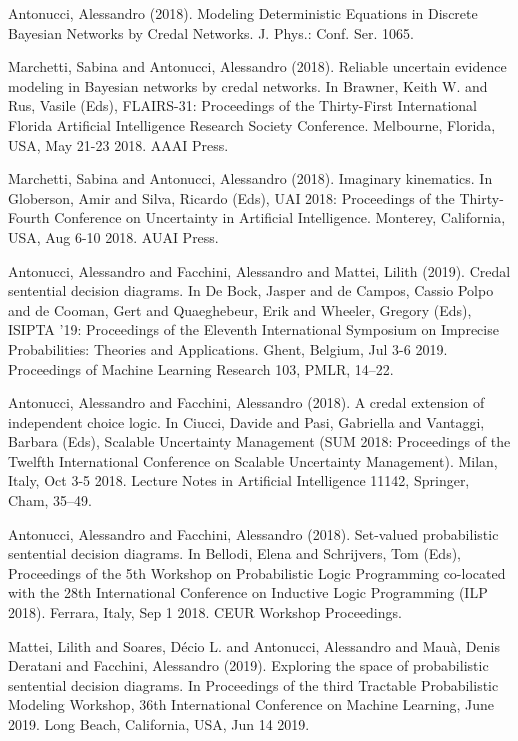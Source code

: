 \begin{cventries}
\begin{cvitems}
\item Antonucci, Alessandro (2018).   Modeling Deterministic Equations in Discrete Bayesian Networks by Credal Networks.   J. Phys.: Conf. Ser. 1065.
\item Marchetti, Sabina and Antonucci, Alessandro (2018).   Reliable uncertain evidence modeling in Bayesian networks by credal networks.   In Brawner, Keith W. and Rus, Vasile (Eds), FLAIRS-31: Proceedings of the Thirty-First International Florida Artificial Intelligence Research Society Conference.   Melbourne, Florida, USA,   May 21-23 2018.   AAAI Press.
\item Marchetti, Sabina and Antonucci, Alessandro (2018).   Imaginary kinematics.   In Globerson, Amir and Silva, Ricardo (Eds), UAI 2018: Proceedings of the Thirty-Fourth Conference on Uncertainty in Artificial Intelligence.   Monterey, California, USA,   Aug 6-10 2018.   AUAI Press.
\item Antonucci, Alessandro and Facchini, Alessandro and Mattei, Lilith (2019).   Credal sentential decision diagrams.   In De Bock, Jasper and de Campos, Cassio Polpo and de Cooman, Gert and Quaeghebeur, Erik and Wheeler, Gregory (Eds), ISIPTA ’19: Proceedings of the Eleventh International Symposium on Imprecise Probabilities: Theories and Applications.   Ghent, Belgium, Jul 3-6 2019.   Proceedings of Machine Learning Research 103, PMLR, 14–22.
\item Antonucci, Alessandro and Facchini, Alessandro (2018).   A credal extension of independent choice logic.   In Ciucci, Davide and Pasi, Gabriella and Vantaggi, Barbara (Eds), Scalable Uncertainty Management (SUM 2018: Proceedings of the Twelfth International Conference on Scalable Uncertainty Management).   Milan, Italy, Oct 3-5 2018.   Lecture Notes in Artificial Intelligence 11142, Springer, Cham, 35–49.
\item Antonucci, Alessandro and Facchini, Alessandro (2018).   Set-valued probabilistic sentential decision diagrams.   In Bellodi, Elena and Schrijvers, Tom (Eds), Proceedings of the 5th Workshop on Probabilistic Logic Programming co-located with the 28th International Conference on Inductive Logic Programming (ILP 2018).   Ferrara, Italy,   Sep 1 2018.   CEUR Workshop Proceedings.
\item Mattei, Lilith and Soares, Décio L. and Antonucci, Alessandro and Mauà, Denis Deratani and Facchini, Alessandro (2019).   Exploring the space of probabilistic sentential decision diagrams.   In Proceedings of the third Tractable Probabilistic Modeling Workshop, 36th International Conference on Machine Learning, June 2019.   Long Beach, California, USA,   Jun 14 2019.

\end{cvitems}
\end{cventries}
